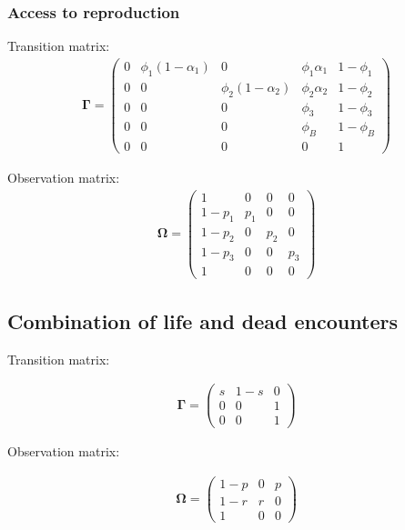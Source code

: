 \documentclass[
]{article}
\begin{document}
\hypertarget{access-to-reproduction}{%
\subsubsection{Access to reproduction}\label{access-to-reproduction}}

Transition matrix: \begin{align*}
\mathbf{\Gamma} = 
\left(\begin{array}{ccccc} 
0 & \phi_1 (1-\alpha_1) & 0 & \phi_1 \alpha_1 & 1 - \phi_1\\ 
0 & 0 & \phi_2 (1-\alpha_2) & \phi_2 \alpha_2 & 1 - \phi_2\\ 
0 & 0 & 0 & \phi_3 & 1 - \phi_3\\ 
0 & 0 & 0 & \phi_B & 1 - \phi_B\\ 
0 & 0 & 0 & 0 & 1
\end{array}\right)
\end{align*}

Observation matrix: \begin{align*}
\mathbf{\Omega} = 
\left(\begin{array}{cccc} 
1 & 0 & 0 & 0\\
1 - p_1 & p_1 & 0 & 0\\ 
1 - p_2 & 0 & p_2 & 0\\ 
1 - p_3 & 0 & 0 & p_3\\ 
1 & 0 & 0 & 0
\end{array}\right)
\end{align*}

\hypertarget{combination-of-life-and-dead-encounters}{%
\subsection{Combination of life and dead
encounters}\label{combination-of-life-and-dead-encounters}}

Transition matrix:

\begin{align*}
\mathbf{\Gamma} = 
\left(\begin{array}{ccc} 
s & 1-s & 0\\ 
0 & 0 & 1\\
0 & 0 & 1
\end{array}\right)
\end{align*}

Observation matrix:

\begin{align*}
\mathbf{\Omega} = 
\left(\begin{array}{ccc} 
1 - p & 0 & p\\ 
1 - r & r & 0\\ 
1 & 0 & 0
\end{array}\right)
\end{align*}
\end{document}

